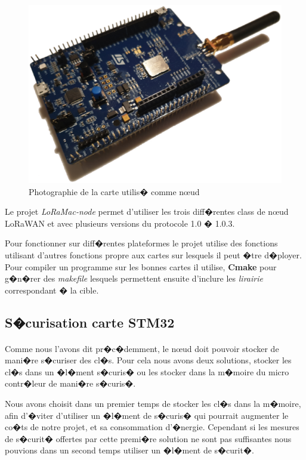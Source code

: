 \documentclass[a4paper, titlepage,12pt]{report}
\begin{document}
\begin{figure}[!h]
\centering
\includegraphics[scale=0.4]{img/eps/loracarte.eps}
\caption{Photographie de la carte utilis� comme n\oe{}ud}
\label{carteLora}
\end{figure}


Le projet \textit{LoRaMac-node} permet d'utiliser les trois diff�rentes class de n\oe{}ud LoRaWAN et avec plusieurs versions du protocole 1.0 � 1.0.3.

Pour fonctionner sur diff�rentes plateformes le projet utilise des fonctions utilisant d'autres fonctions propre aux cartes sur lesquels il peut �tre d�ployer. Pour compiler un programme sur les bonnes cartes il utilise, \textbf{Cmake} pour g�n�rer des \textit{makefile} lesquels permettent ensuite d'inclure les \textit{lirairie} correspondant � la cible.

\subsection{S�curisation carte STM32}
\paragraph{}
Comme nous l'avons dit pr�c�demment, le n\oe{}ud doit pouvoir stocker de mani�re s�curiser des cl�s. Pour cela nous avons deux solutions, stocker les cl�s dans un �l�ment s�curis� ou les stocker dans la m�moire du micro contr�leur de mani�re s�curis�.

Nous avons choisit dans un premier temps de stocker les cl�s dans la m�moire, afin d'�viter d'utiliser un �l�ment de s�curis� qui pourrait augmenter le co�ts de notre projet, et sa consommation d'�nergie. Cependant si les mesures de s�curit� offertes par cette premi�re solution ne sont pas suffisantes nous pouvions dans un second temps utiliser un �l�ment de s�curit�.
\end{document}
